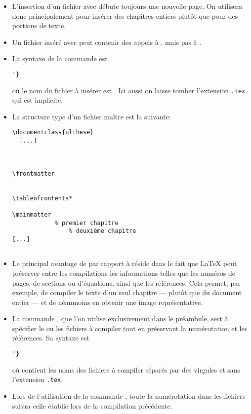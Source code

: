 \begin{itemize}
\item L'insertion d'un fichier avec \verb== débute toujours
  une nouvelle page. On utilisera donc \verb== principalement
  pour insérer des chapitres entiers plutôt que pour des portions de
  texte.
\item Un fichier inséré avec \verb== peut contenir des appels
  à \verb==, mais pas à \verb==.
\item La syntaxe de la commande \verb== est
\begin{lstlisting}
'}
\end{lstlisting}
  où le nom du fichier à insérer est . Ici
  aussi on laisse tomber l'extension \verb=.tex= qui est implicite.
\item La structure type d'un fichier maître est la suivante:
\begin{lstlisting}
\documentclass{ulthese}
  [...]



\frontmatter


\tableofcontents*

\mainmatter
            % premier chapitre
                % deuxième chapitre
[...]


\end{lstlisting}

\item Le principal avantage de \verb== par rapport à
  \verb== réside dans le fait que {\LaTeX} peut préserver entre
  les compilations les informations telles que les numéros de pages,
  de sections ou d'équations, ainsi que les références. Cela permet,
  par exemple, de compiler le texte d'un seul chapitre --- plutôt que
  du document entier --- et de néanmoins en obtenir une image
  représentative.
\item La commande \verb==, que l'on utilise exclusivement
  dans le préambule, sert à spécifier le ou les fichiers à compiler
  tout en préservant la numérotation et les références. Sa syntaxe est
\begin{lstlisting}
'}
\end{lstlisting}
  où  contient les noms des fichiers à
  compiler séparés par des virgules et sans l'extension \verb=.tex=.
\item Lors de l'utilisation de la commande \verb==, toute
  la numérotation dans les fichiers 
  suivra celle établie lors de la compilation précédente.
\end{itemize}


